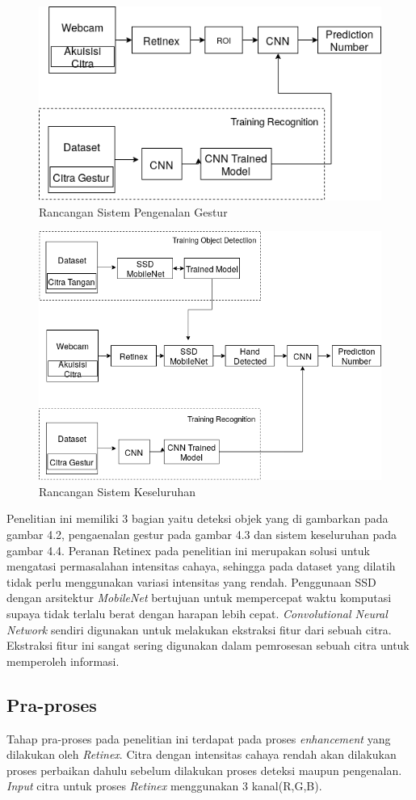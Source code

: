 \begin{figure}[H]
	\centering
	\includegraphics[width=0.64\linewidth]{cnnn}
	\caption{Rancangan Sistem Pengenalan Gestur}
	\label{fig:cnnn}
\end{figure}
\begin{figure}[H]
	\centering
	\includegraphics[width=0.7\linewidth]{keseluruhan}
	\caption{Rancangan Sistem Keseluruhan}
	\label{fig:rancangan}
\end{figure}

Penelitian ini memiliki 3 bagian yaitu deteksi objek yang di gambarkan pada gambar 4.2, pengaenalan gestur pada gambar 4.3 dan sistem keseluruhan pada gambar 4.4.
Peranan Retinex pada penelitian ini merupakan solusi untuk mengatasi permasalahan intensitas cahaya, sehingga pada dataset yang dilatih tidak perlu menggunakan variasi intensitas yang rendah. Penggunaan SSD dengan arsitektur \emph{MobileNet} bertujuan untuk mempercepat waktu komputasi supaya tidak terlalu berat dengan harapan lebih cepat. \emph{Convolutional Neural Network} sendiri digunakan untuk melakukan ekstraksi fitur dari sebuah citra. Ekstraksi fitur ini sangat sering digunakan dalam pemrosesan sebuah citra untuk memperoleh informasi. 
\subsection{Pra-proses}
Tahap pra-proses pada penelitian ini terdapat pada proses \emph{enhancement} yang dilakukan oleh \emph{Retinex}. Citra dengan intensitas cahaya rendah akan dilakukan proses perbaikan dahulu sebelum dilakukan proses deteksi maupun pengenalan. \emph{Input} citra untuk proses \emph{Retinex} menggunakan 3 kanal(R,G,B).

